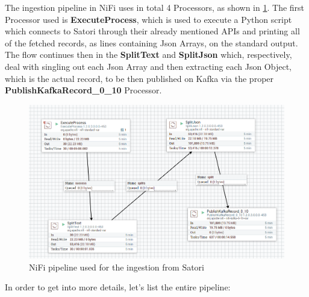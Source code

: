 The ingestion pipeline in NiFi uses in total 4 Processors, as shown in \ref{fig:nifipipeline}. The first Processor used is \textbf{ExecuteProcess}, which is used to execute a Python script which connects to Satori through their already mentioned APIs and printing all of the fetched records, as lines containing Json Arrays, on the standard output. The flow continues then in the \textbf{SplitText} and \textbf{SplitJson} which, respectively, deal with singling out each Json Array and then extracting each Json Object, which is the actual record, to be then published on Kafka via the proper \textbf{PublishKafkaRecord\_0\_10} Processor.

\begin{figure}[ph]
    \centering
    \includegraphics[width=0.7\linewidth]{Figures/nifipipeline}
    \caption{NiFi pipeline used for the ingestion from Satori}
    \label{fig:nifipipeline}
\end{figure}

In order to get into more details, let's list the entire pipeline:

